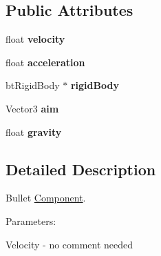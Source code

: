 \subsection*{\-Public \-Attributes}
\begin{DoxyCompactItemize}
\item 
\hypertarget{classComponentBullet_ac7513dff8b3e5d2c8235f4cb1d0c3380}{
float {\bfseries velocity}}
\label{d0/d26/classComponentBullet_ac7513dff8b3e5d2c8235f4cb1d0c3380}

\item 
\hypertarget{classComponentBullet_a08fafe48bd45978ceb9886aedf6d7005}{
float {\bfseries acceleration}}
\label{d0/d26/classComponentBullet_a08fafe48bd45978ceb9886aedf6d7005}

\item 
\hypertarget{classComponentBullet_affc49c6fbcbe5e32633f971797926df1}{
bt\-Rigid\-Body $\ast$ {\bfseries rigid\-Body}}
\label{d0/d26/classComponentBullet_affc49c6fbcbe5e32633f971797926df1}

\item 
\hypertarget{classComponentBullet_a6779f7676718b78e076afde514696f33}{
\-Vector3 {\bfseries aim}}
\label{d0/d26/classComponentBullet_a6779f7676718b78e076afde514696f33}

\item 
\hypertarget{classComponentBullet_a53c46b3f646f8df97f28233d98374390}{
float {\bfseries gravity}}
\label{d0/d26/classComponentBullet_a53c46b3f646f8df97f28233d98374390}

\end{DoxyCompactItemize}


\subsection{\-Detailed \-Description}
\-Bullet \hyperlink{classComponent}{\-Component}. 

\-Parameters\-:\par
 \-Velocity -\/ no comment needed 

